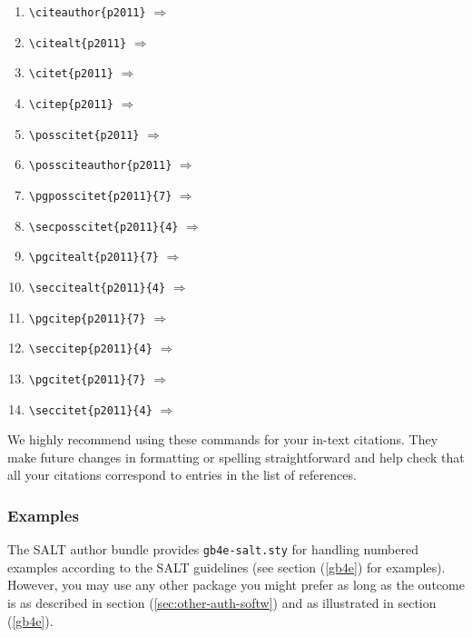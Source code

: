 \documentclass{salt}
\begin{document}
\begin{exe}
\item 
\begin{enumerate}
\item \verb+\citeauthor{p2011}+ $\Rightarrow$ \citeauthor{p2011} 
\item \verb+\citealt{p2011}+ $\Rightarrow$ \citealt{p2011} 
\item \verb+\citet{p2011}+ $\Rightarrow$ \citet{p2011} 
\item \verb+\citep{p2011}+ $\Rightarrow$ \citep{p2011}
\item \verb+\posscitet{p2011}+ $\Rightarrow$ 
\item \verb+\possciteauthor{p2011}+ $\Rightarrow$  
\item \verb+\pgposscitet{p2011}{7}+ $\Rightarrow$ 
\item \verb+\secposscitet{p2011}{4}+ $\Rightarrow$ 
\item \verb+\pgcitealt{p2011}{7}+ $\Rightarrow$ 
\item \verb+\seccitealt{p2011}{4}+ $\Rightarrow$  
\item \verb+\pgcitep{p2011}{7}+ $\Rightarrow$ 
\item \verb+\seccitep{p2011}{4}+ $\Rightarrow$  
\item \verb+\pgcitet{p2011}{7}+ $\Rightarrow$  
\item \verb+\seccitet{p2011}{4}+ $\Rightarrow$ 
\end{enumerate}
\end{exe}

We highly recommend using these commands for your in-text citations. They make future changes in formatting or spelling straightforward and help check that all your citations correspond to entries in the list of references.

\subsubsection{Examples}

The SALT author bundle provides \verb+gb4e-salt.sty+ for handling numbered examples according to the SALT guidelines (see section (\ref{gb4e}) for examples). However, you may use any other package you might prefer as long as the outcome is as described in section (\ref{sec:other-auth-softw}) and as illustrated in section (\ref{gb4e}).
\end{document}
